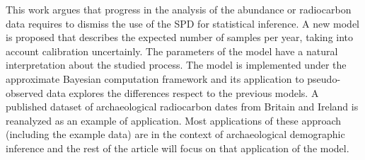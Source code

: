 \documentclass[a4paper]{article}
\begin{document}
This work argues that progress in the analysis of the abundance or radiocarbon data requires to dismiss the use of the SPD for statistical inference. A new model is proposed that describes the expected number of samples per year, taking into account calibration uncertainly. The parameters of the model have a natural interpretation about the studied process. The model is implemented under the approximate Bayesian computation framework and its application to pseudo-observed data explores the differences respect to the previous models. A published dataset of archaeological radiocarbon dates from Britain and Ireland \parencite{Bevan2017b} is reanalyzed as an example of application. Most applications of these approach (including the example data) are in the context of archaeological demographic inference and the rest of the article will focus on that application of the model.
\\





\end{document}
